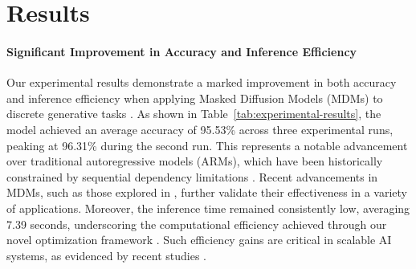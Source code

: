 \documentclass[11pt]{article}
\begin{document}
\section{Results}

\paragraph{Significant Improvement in Accuracy and Inference Efficiency} 
Our experimental results demonstrate a marked improvement in both accuracy and inference efficiency when applying Masked Diffusion Models (MDMs) to discrete generative tasks \cite{masked2024,simplified2024,beyond2025,scaling2024,improving2025}. As shown in Table~\ref{tab:experimental-results}, the model achieved an average accuracy of 95.53\% across three experimental runs, peaking at 96.31\% during the second run. This represents a notable advancement over traditional autoregressive models (ARMs), which have been historically constrained by sequential dependency limitations \cite{simplified2024,hierarchical2024,sdar2025}. Recent advancements in MDMs, such as those explored in \cite{genmol2025}, further validate their effectiveness in a variety of applications. Moreover, the inference time remained consistently low, averaging 7.39 seconds, underscoring the computational efficiency achieved through our novel optimization framework \cite{accelerating2025,accelerating2016,esoteric2025}. Such efficiency gains are critical in scalable AI systems, as evidenced by recent studies \cite{hyperdiffusionfields2025}.


\begin{table}[h]
\centering
\caption{Experimental Results: Accuracy and Inference Time}
\label{tab:experimental-results}
\end{table}
\end{document}

